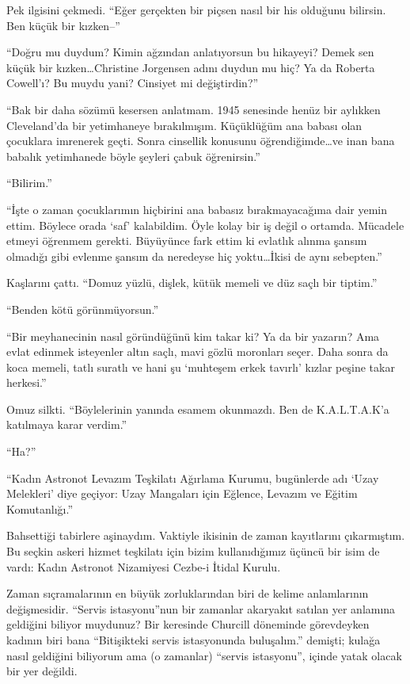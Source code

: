 Pek ilgisini çekmedi. ``Eğer gerçekten bir piçsen nasıl bir his olduğunu
bilirsin. Ben küçük bir kızken--''

``Doğru mu duydum? Kimin ağzından anlatıyorsun bu hikayeyi? Demek sen küçük bir
kızken\dots Christine Jorgensen adını duydun mu hiç? Ya da Roberta Cowell'ı?
Bu muydu yani? Cinsiyet mi değiştirdin?''

``Bak bir daha sözümü kesersen anlatmam. 1945 senesinde henüz bir aylıkken
Cleveland'da bir yetimhaneye bırakılmışım. Küçüklüğüm ana babası olan çocuklara
imrenerek geçti. Sonra cinsellik konusunu öğrendiğimde\dots ve inan bana babalık
yetimhanede böyle şeyleri çabuk öğrenirsin.''

``Bilirim.''

``İşte o zaman çocuklarımın hiçbirini ana babasız bırakmayacağıma dair yemin
ettim. Böylece orada `saf' kalabildim. Öyle kolay bir iş değil o ortamda.
Mücadele etmeyi öğrenmem gerekti. Büyüyünce fark ettim ki evlatlık alınma şansım
olmadığı gibi evlenme şansım da neredeyse hiç yoktu\dots İkisi de aynı
sebepten.''

Kaşlarını çattı. ``Domuz yüzlü, dişlek, kütük memeli ve düz saçlı bir tiptim.''

``Benden kötü görünmüyorsun.''

``Bir meyhanecinin nasıl göründüğünü kim takar ki? Ya da bir yazarın? Ama evlat
edinmek isteyenler altın saçlı, mavi gözlü moronları seçer. Daha sonra da koca
memeli, tatlı suratlı ve hani şu `muhteşem erkek tavırlı' kızlar peşine takar
herkesi.''

Omuz silkti. ``Böylelerinin yanında esamem okunmazdı. Ben de K.A.L.T.A.K'a
katılmaya karar verdim.''

``Ha?''

``Kadın Astronot Levazım Teşkilatı Ağırlama Kurumu, bugünlerde adı `Uzay
Melekleri' diye geçiyor: Uzay Mangaları için Eğlence, Levazım ve Eğitim
Komutanlığı.''

Bahsettiği tabirlere aşinaydım. Vaktiyle ikisinin de zaman kayıtlarını
çıkarmıştım. Bu seçkin askeri hizmet teşkilatı için bizim kullanıdığımız üçüncü
bir isim de vardı: Kadın Astronot Nizamiyesi Cezbe-i İtidal Kurulu.

Zaman sıçramalarının en büyük zorluklarından biri de kelime anlamlarının
değişmesidir. ``Servis istasyonu''nun bir zamanlar akaryakıt satılan yer
anlamına geldiğini biliyor muydunuz? Bir keresinde Churcill döneminde
görevdeyken kadının biri bana ``Bitişikteki servis istasyonunda buluşalım.''
demişti; kulağa nasıl geldiğini biliyorum ama (o zamanlar) ``servis
istasyonu'', içinde yatak olacak bir yer değildi.

